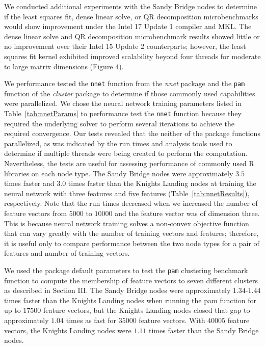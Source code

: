 We conducted additional experiments with the Sandy Bridge nodes to determine if
  the least squares fit, dense linear solve, or QR decomposition microbenchmarks
  would show improvement under the Intel 17 Update 1 compiler and MKL.
The dense linear solve and QR decomposition microbenchmark results showed little
  or no improvement over their Intel 15 Update 2 counterparts; however, the
  least squares fit kernel exhibited improved scalability beyond four threads
  for moderate to large matrix dimensions (Figure 4).   

We performance tested the \texttt{nnet} function from the \textit{nnet} package
  and the \texttt{pam} function of the \textit{cluster} package to determine if
  those commonly used capabilities were parallelized.
We chose the neural network training parameters listed in Table~\ref{tab:nnetParams} to
  performance test the \texttt{nnet} function because they required the
  underlying solver to perform several iterations to achieve the required
  convergence.
Our tests revealed that the neither of the package functions parallelized, as
  was indicated by the run times and analysis tools used to determine if
  multiple threads were being created to perform the computation.
Nevertheless, the tests are useful for assessing performance of commonly used R
  libraries on each node type.
The Sandy Bridge nodes were approximately $3.5$ times faster and $3.0$ times
  faster than the Knights Landing nodes at training the neural network with
  three features and five features (Table~\ref{tab:nnetResults}), respectively.
Note that the run times decreased when we increased the number of feature
  vectors from $5000$ to $10000$ and the feature vector was of dimension three.
This is because neural network training solves a non-convex objective function
  that can vary greatly with the number of training vectors and features;
  therefore, it is useful only to compare performance between the two node types
  for a pair of features and number of training vectors.

We used the package default parameters to test the \texttt{pam} clustering
  benchmark function to compute the membership of feature vectors to seven
  different clusters as described in Section III.
The Sandy Bridge nodes were approximately $1.34$-$1.44$ times faster than the
  Knights Landing nodes when running the pam function for up to $17500$ feature
  vectors, but the Knights Landing nodes closed that gap to approximately $1.04$
  times as fast for $35000$ feature vectors.
With $40005$ feature vectors, the Knights Landing nodes were $1.11$ times faster
  than the Sandy Bridge nodes.

